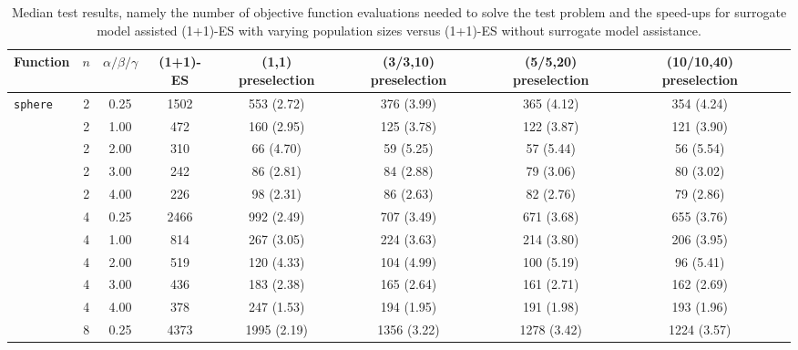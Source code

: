 \begin{table*} 
\caption{Median test results, namely the number of objective function evaluations needed to solve the test problem and the speed-ups for surrogate model assisted (1+1)-ES with varying population sizes versus (1+1)-ES without surrogate model assistance.}
\begin{tabular}{ l*{8}{c}}
\toprule  %
\textbf{Function} & \multicolumn{1}{c}{$n$} &  \multicolumn{1}{c}{$\alpha/\beta/\gamma$} & \multicolumn{1}{c}{(1+1)-ES} &\multicolumn{1}{c}{(1,1) preselection} & \multicolumn{1}{c}{(3/3,10) preselection} & \multicolumn{1}{c}{(5/5,20) preselection} & \multicolumn{1}{c}{(10/10,40) preselection}  \\
\midrule
\texttt{sphere} &    2 &    0.25 &    1502 &    553 (2.72) & 376 (3.99) & 365 (4.12) & 354 (4.24) \\ 
    
&    2 &    1.00 &    472 &    160 (2.95) & 125 (3.78) & 122 (3.87) & 121 (3.90) \\ 
    
&    2 &    2.00 &    310 &    66 (4.70) & 59 (5.25) & 57 (5.44) & 56 (5.54) \\ 
    
&    2 &    3.00 &    242 &    86 (2.81) & 84 (2.88) & 79 (3.06) & 80 (3.02) \\ 
    
&    2 &    4.00 &    226 &    98 (2.31) & 86 (2.63) & 82 (2.76) & 79 (2.86) \\ 
    
&    4 &    0.25 &    2466 &    992 (2.49) & 707 (3.49) & 671 (3.68) & 655 (3.76) \\ 
    
&    4 &    1.00 &    814 &    267 (3.05) & 224 (3.63) & 214 (3.80) & 206 (3.95) \\ 
    
&    4 &    2.00 &    519 &    120 (4.33) & 104 (4.99) & 100 (5.19) & 96 (5.41) \\ 
    
&    4 &    3.00 &    436 &    183 (2.38) & 165 (2.64) & 161 (2.71) & 162 (2.69) \\ 
    
&    4 &    4.00 &    378 &    247 (1.53) & 194 (1.95) & 191 (1.98) & 193 (1.96) \\ 
    
&    8 &    0.25 &    4373 &    1995 (2.19) & 1356 (3.22) & 1278 (3.42) & 1224 (3.57) \\ 
    

\end{tabular}
\end{table*}
